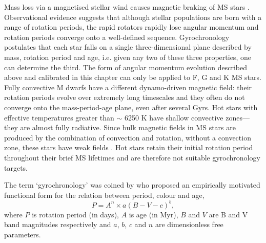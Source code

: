Mass loss via a magnetised stellar wind causes magnetic braking of MS stars
\citep{Weber1967}.
Observational evidence suggests  that although stellar populations are born
with a range of rotation periods, the rapid rotators rapidly lose angular
momentum and rotation periods converge onto a well-defined sequence.
Gyrochronology postulates that each star falls on a single three-dimensional
plane described by mass, rotation period and age, i.e. given any two of these
three properties, one can determine the third.
The form of angular momentum evolution described above and calibrated in this
chapter can only be applied to F, G and K MS stars.
Fully convective M dwarfs have a different dynamo-driven magnetic field: their
rotation periods evolve over extremely long timescales and they often do not
converge onto the mass-period-age plane, even after several Gyrs.
Hot stars with effective temperatures greater than $\sim$ 6250 K have shallow
convective zones---they are almost fully radiative.
Since bulk magnetic fields in MS stars are produced by the combination of
convection and rotation, without a convection zone, these stars have weak
fields \citep{Kraft1967}.
Hot stars retain their initial rotation period throughout their brief MS
lifetimes and are therefore not suitable gyrochronology targets.

The term `gyrochronology' was coined by \citet{Barnes2003} who proposed an
empirically motivated functional form for the relation between period, colour
and age, \begin{equation} \label{eq:Barnes2007_2} P = A^n \times a(B-V-c)^b,
\end{equation} where $P$ is rotation period (in days), $A$ is age (in Myr),
$B$ and $V$ are B and V band magnitudes respectively and $a$, $b$, $c$ and $n$
are dimensionless free parameters.  %

